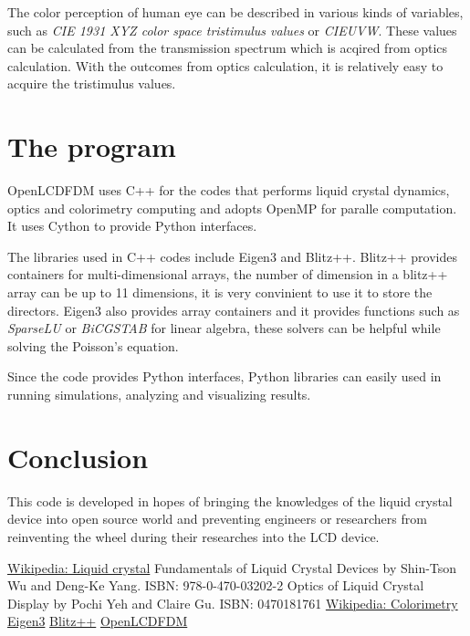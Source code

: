 \documentclass[11pt, a4paper]{article} %
\begin{document}
\begin{multicols}{2}
The color perception of human eye can be described in various kinds of variables, such as \emph{CIE 1931 XYZ color space tristimulus values} or \emph{CIEUVW}\cite{wiki_colorimetry}. These values can be calculated from the transmission spectrum which is acqired from optics calculation. With the outcomes from optics calculation, it is relatively easy to acquire the tristimulus values.

\section{The program}
OpenLCDFDM uses C++ for the codes that performs liquid crystal dynamics, optics and colorimetry computing and adopts OpenMP for paralle computation. It uses Cython to provide Python interfaces. 

The libraries used in C++ codes include Eigen3\cite{libeigen} and Blitz++\cite{blitz}. Blitz++ provides containers for multi-dimensional arrays, the number of dimension in a blitz++ array can be up to 11 dimensions, it is very convinient to use it to store the directors. Eigen3 also provides array containers and it provides functions such as \emph{SparseLU} or \emph{BiCGSTAB} for linear algebra, these solvers can be helpful while solving the Poisson's equation.

Since the code provides Python interfaces, Python libraries can easily used in running simulations, analyzing and visualizing results.

\section{Conclusion}
This code is developed in hopes of bringing the knowledges of the liquid crystal device into open source world and preventing engineers or researchers from reinventing the wheel during their researches into the LCD device.

\begin{thebibliography}{7}
\href{http://en.wikipedia.org/wiki/Liquid_crystal}{Wikipedia: Liquid crystal}
Fundamentals of Liquid Crystal Devices by Shin-Tson Wu and Deng-Ke Yang. ISBN: 978-0-470-03202-2
Optics of Liquid Crystal Display by Pochi Yeh and Claire Gu. ISBN: 0470181761
\href{http://en.wikipedia.org/wiki/Colorimetry}{Wikipedia: Colorimetry}
\href{http://eigen.tuxfamily.org/index.php?title=Main_Page}{Eigen3}
\href{http://sourceforge.net/projects/blitz/}{Blitz++}
\href{https://github.com/xingularity/OpenLCDFDM}{OpenLCDFDM}
\end{thebibliography}
\end{multicols}
\end{document}
